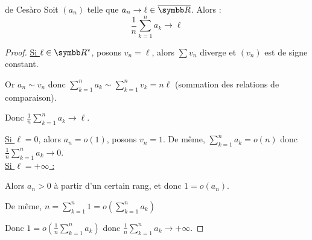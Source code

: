 \begin{proposition}{de Cesàro}{}
    Soit $(a_n)$ telle que $a_n \to \ell \in \overline \R$. Alors :
    \[\frac 1 n \sum_{k = 1}^{n } a_k \to \ell\]
\end{proposition}


\begin{proof}
    \uline{Si $\ell \in \R^*$}, posons $v_n = \ell$, alors $\sum v_n$ diverge et $(v_n)$ est de signe constant.

    Or $\displaystyle a_n \sim v_n$ donc $\displaystyle \sum_{k = 1}^{n } a_k \sim \sum_{k = 1}^{n } v_k = n \ell$ (sommation des relations de comparaison). 

    Donc $\displaystyle \frac 1 n \sum_{k = 1}^{n } a_k \longrightarrow \ell$.

    \uline{Si $\ell = 0$}, alors $a_n = o(1)$, posons $v_n = 1$.
    De même, $\displaystyle \sum_{k = 1}^{n } a_k = o(n)$ donc $\displaystyle \frac 1 n \sum_{k = 1}^{n } a_k \longrightarrow 0$. \\

    \uline{Si $\ell = + \infty$ :} 

    \svspace Alors $a_n > 0 $ à partir d'un certain rang, et donc $1 = o(a_n)$.

    De même, $\displaystyle n = \sum_{k = 1}^{n } 1 = o\left( \sum_{k = 1}^{n } a_k \right)$ 

    Donc $\displaystyle 1 = o\left( \frac 1 n \sum_{k = 1}^{n } a_k \right)$ donc $\displaystyle \frac 1 n \sum_{k = 1}^{n } a_k \longrightarrow + \infty$.
\end{proof}

